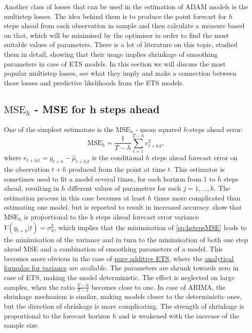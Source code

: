 \documentclass[
]{book}
\theoremstyle{definition}
\theoremstyle{definition}
\theoremstyle{definition}
\theoremstyle{definition}
\theoremstyle{remark}
\begin{document}
Another class of losses that can be used in the estimation of ADAM models is the multistep losses. The idea behind them is to produce the point forecast for \(h\) steps ahead from each observation in sample and then calculate a measure based on that, which will be minimised by the optimiser in order to find the most suitable values of parameters. There is a lot of literature on this topic, \citet{Svetunkov2020Multistep} studied them in detail, showing that their usage implies shrinkage of smoothing parameters in case of ETS models. In this section we will discuss the most popular multistep losses, see what they imply and make a connection between these losses and predictive likelihoods from the ETS models.

\hypertarget{mathrmmse_h---mse-for-h-steps-ahead}{%
\subsection{\texorpdfstring{\(\mathrm{MSE}_h\) - MSE for h steps ahead}{\textbackslash mathrm\{MSE\}\_h - MSE for h steps ahead}}\label{mathrmmse_h---mse-for-h-steps-ahead}}

One of the simplest estimators is the \(\mathrm{MSE}_h\) - mean squared \(h\)-steps ahead error:
\begin{equation}
    \mathrm{MSE}_h = \frac{1}{T-h} \sum_{t=1}^{T-h} e_{t+h|t}^2 ,
  \label{eq:hstepsMSE}
\end{equation}
where \(e_{t+h|t} = y_{t+h} - \hat{\mu}_{t+h|t}\) is the conditional \(h\) steps ahead forecast error on the observation \(t+h\) produced from the point at time \(t\). This estimator is sometimes used to fit a model several times, for each horizon from 1 to \(h\) steps ahead, resulting in \(h\) different values of parameters for each \(j=1, \ldots, h\). The estimation process in this case becomes at least \(h\) times more complicated than estimating one model, but is reported to result in increased accuracy. \citet{Svetunkov2020Multistep} show that MSE\(_h\) is proportional to the h steps ahead forecast error variance \(V(y_{t+h}|t)=\sigma^2_{h}\), which implies that the minimisation of \eqref{eq:hstepsMSE} leads to the minimisation of the variance and in turn to the minimisation of both one step ahead MSE and a combination of smoothing parameters of a model. This becomes more obvious in the case of \protect\hyperlink{ADAMETSPureAdditive}{pure additive ETS}, where the \protect\hyperlink{pureAdditiveExpectationAndVariance}{analytical formulae for variance} are available. The parameters are shrunk towards zero in case of ETS, making the model deterministic. The effect is neglected on large samples, when the ratio \(\frac{T-h}{T-1}\) becomes close to one. In case of ARIMA, the shrinkage mechanism is similar, making models closer to the deterministic ones, but the direction of shrinkage is more complicating. The strength of shrinkage is proportional to the forecast horizon \(h\) and is weakened with the increase of the sample size.
\end{document}
